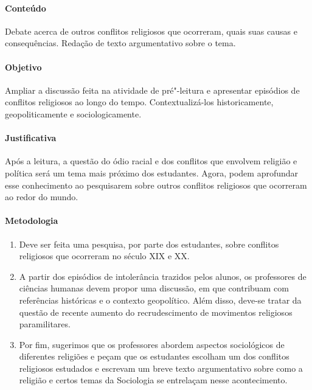 \documentclass[12pt]{extarticle}
\begin{document}
\paragraph{Conteúdo} Debate acerca de outros conflitos religiosos
que ocorreram, quais suas causas e consequências. Redação de texto
argumentativo sobre o tema.

\paragraph{Objetivo} Ampliar a discussão feita na atividade de pré"-leitura
e apresentar episódios de conflitos religiosos ao longo do tempo.
Contextualizá-los historicamente, geopoliticamente e sociologicamente.

\paragraph{Justificativa} Após a leitura, a questão do ódio racial e dos
conflitos que envolvem religião e política será um tema mais próximo dos estudantes.
Agora, podem aprofundar esse conhecimento ao pesquisarem sobre outros conflitos 
religiosos que ocorreram ao redor do mundo.

\paragraph{Metodologia}

\begin{enumerate}

\item Deve ser feita uma pesquisa, por parte dos estudantes, sobre
conflitos religiosos que ocorreram no século XIX e XX. 

\item A partir dos episódios de intolerância trazidos pelos 
alunos, os professores de ciências humanas devem propor uma discussão,
em que contribuam com referências históricas e o contexto geopolítico.
Além disso, deve-se tratar da questão de recente aumento do
recrudescimento de movimentos religiosos
paramilitares. 

\item Por fim, sugerimos que os professores abordem
aspectos sociológicos de diferentes
religiões e peçam que os estudantes escolham um 
dos conflitos religiosos estudados e escrevam um
breve texto argumentativo sobre como a religião
e certos temas da Sociologia se entrelaçam nesse acontecimento.

\end{enumerate}
\end{document}
